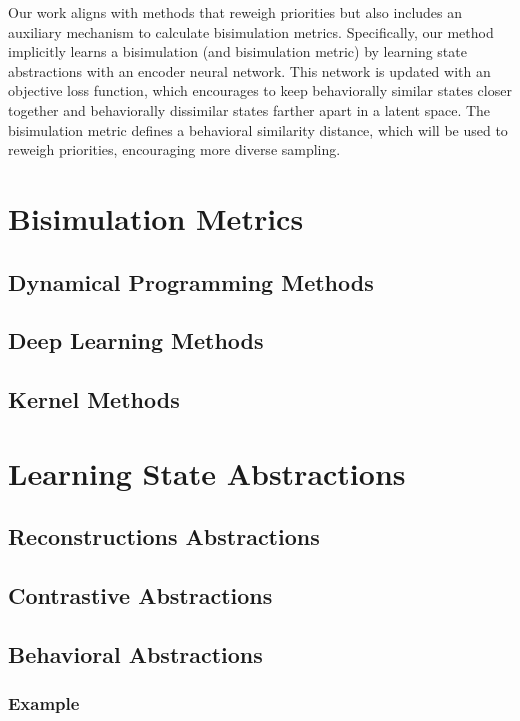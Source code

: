Our work aligns with methods that reweigh priorities but also includes an auxiliary mechanism to calculate bisimulation metrics. Specifically, our method implicitly learns a bisimulation (and bisimulation metric) by learning state abstractions with an encoder neural network. This network is updated with an objective loss function, which encourages to keep behaviorally similar states closer together and behaviorally dissimilar states farther apart in a latent space. The bisimulation metric defines a behavioral similarity distance, which will be used to reweigh priorities, encouraging more diverse sampling.

\section{Bisimulation Metrics}


\subsection{Dynamical Programming Methods}
\subsection{Deep Learning Methods}
\subsection{Kernel Methods}
\section{Learning State Abstractions}
\subsection{Reconstructions Abstractions}
\subsection{Contrastive Abstractions}
\subsection{Behavioral Abstractions}
\subsubsection{Example}